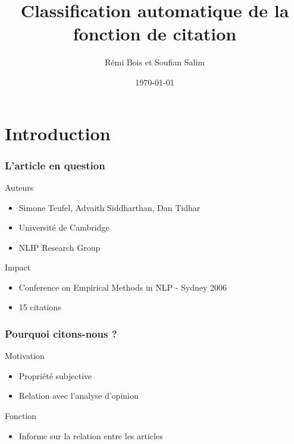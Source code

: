 \documentclass[10pt]{beamer}
\title{Classification automatique de la fonction de citation}
\author{Rémi Bois et Soufian Salim}
\date{\today}
\begin{document}
\begin{frame}
  \maketitle
\end{frame}

\section{Introduction}
\label{sec:intro}

\begin{frame}
  \frametitle{L'article en question}
  
  \begin{block}{Auteurs}
	  \begin{itemize}
		\item Simone Teufel, Advaith Siddharthan, Dan Tidhar
		\item Université de Cambridge
		\item NLIP Research Group
	  \end{itemize}
  \end{block}

  \begin{block}{Impact}
	  \begin{itemize}
		\item Conference on Empirical Methods in NLP - Sydney 2006
		\item 15 citations
	  \end{itemize}
  \end{block}
\end{frame}

\begin{frame}
  \frametitle{Pourquoi citons-nous ?}

  \begin{block}{Motivation}
	  \begin{itemize}
		\item Propriété subjective
		\item Relation avec l'analyse d'opinion
	  \end{itemize}
  \end{block}

  \begin{block}{Fonction}
	  \begin{itemize}
		\item Informe sur la relation entre les articles
	  \end{itemize}
  \end{block}
\end{frame}
\end{document}
